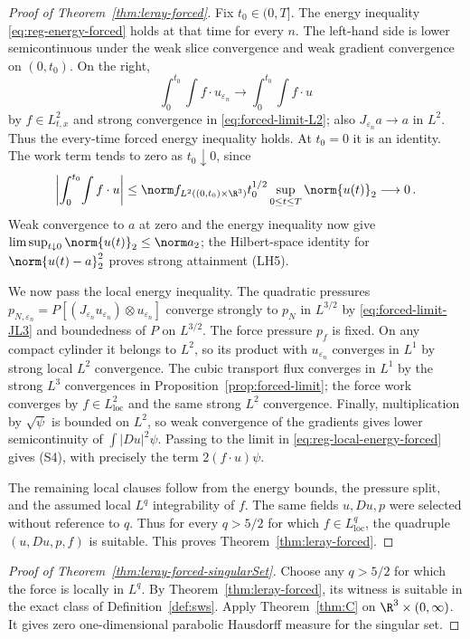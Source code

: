 \documentclass[11pt,reqno]{amsart}
\begin{document}
\begin{proof}[Proof of Theorem~\ref{thm:leray-forced}]
Fix $t_0\in(0,T]$. The energy inequality
\eqref{eq:reg-energy-forced} holds at that time for every $n$. The
left-hand side is lower semicontinuous under the weak slice convergence
and weak gradient convergence on $(0,t_0)$. On the right,
\[
 \int_0^{t_0}\!\int f\cdot u_{\varepsilon_n}
   \longrightarrow \int_0^{t_0}\!\int f\cdot u
\]
by $f\in L^2_{t,x}$ and strong convergence in
\eqref{eq:forced-limit-L2}; also $J_{\varepsilon_n}a\to a$ in $L^2$.
Thus the every-time forced energy inequality holds. At $t_0=0$ it is an
identity. The work term tends to zero as $t_0\downarrow0$, since
\[
 \left|\int_0^{t_0}\!\int f\cdot u\right|
 \le \norm f_{L^2((0,t_0)\times\R^3)}
       t_0^{1/2}\sup_{0\le t\le T}\norm{u(t)}_2\longrightarrow0\,.
\]
Weak convergence to $a$ at zero and the energy inequality now give
$\limsup_{t\downarrow0}\norm{u(t)}_2\le\norm a_2$; the
Hilbert-space identity for $\norm{u(t)-a}_2^2$ proves strong attainment
(LH5).

We now pass the local energy inequality. The quadratic pressures
$p_{N,\varepsilon_n}=P[(J_{\varepsilon_n}u_{\varepsilon_n})\otimes
u_{\varepsilon_n}]$ converge strongly to $p_N$ in $L^{3/2}$ by
\eqref{eq:forced-limit-JL3} and boundedness of $P$ on $L^{3/2}$. The force
pressure $p_f$ is fixed. On any compact cylinder it belongs to $L^2$, so
its product with $u_{\varepsilon_n}$ converges in $L^1$ by strong local
$L^2$ convergence. The cubic transport flux converges in $L^1$ by the
strong $L^3$ convergences in Proposition~\ref{prop:forced-limit}; the
force work converges by $f\in L^2_{\mathrm{loc}}$ and the same strong
$L^2$ convergence. Finally, multiplication by $\sqrt\psi$ is bounded on
$L^2$, so weak convergence of the gradients gives lower semicontinuity of
$\int|Du|^2\psi$. Passing to the limit in
\eqref{eq:reg-local-energy-forced} gives (S4), with precisely the term
$2(f\cdot u)\psi$.

The remaining local clauses follow from the energy bounds, the pressure
split, and the assumed local $L^q$ integrability of $f$. The same fields
$u,Du,p$ were selected without reference to $q$. Thus for every
$q>5/2$ for which $f\in L^q_{\mathrm{loc}}$, the quadruple
$(u,Du,p,f)$ is suitable. This proves Theorem~\ref{thm:leray-forced}.
\end{proof}

\begin{proof}[Proof of Theorem~\ref{thm:leray-forced-singularSet}]
Choose any $q>5/2$ for which the force is locally in $L^q$. By
Theorem~\ref{thm:leray-forced}, its witness is suitable in the exact class
of Definition~\ref{def:sws}. Apply Theorem~\ref{thm:C}
on $\R^3\times(0,\infty)$. It gives zero
one-dimensional parabolic Hausdorff measure for the singular set.
\end{proof}
\end{document}
